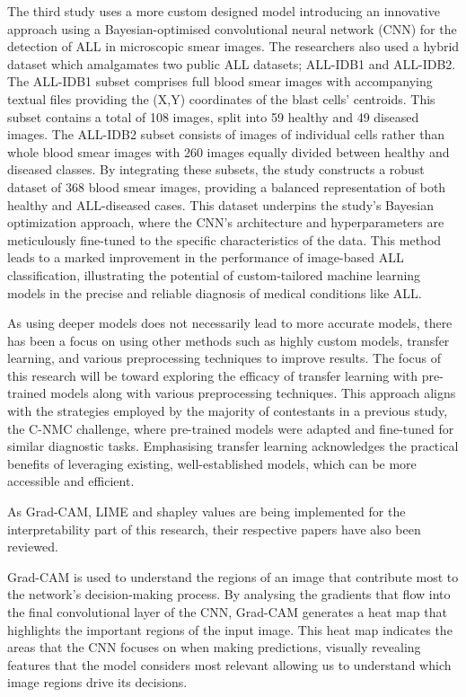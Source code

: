 \documentclass[
	a4paper,
	10pt,
	unnumberedsections,
	twoside,
]{research_article}
\begin{document}
The third study uses a more custom designed model introducing an innovative approach using a Bayesian-optimised convolutional neural network (CNN) for the detection of ALL in microscopic smear images. The researchers also used a hybrid dataset which amalgamates two public ALL datasets; ALL-IDB1 and ALL-IDB2. The ALL-IDB1 subset comprises full blood smear images with accompanying textual files providing the (X,Y) coordinates of the blast cells' centroids. This subset contains a total of 108 images, split into 59 healthy and 49 diseased images. The ALL-IDB2 subset consists of images of individual cells rather than whole blood smear images with 260 images equally divided between healthy and diseased classes. By integrating these subsets, the study constructs a robust dataset of 368 blood smear images, providing a balanced representation of both healthy and ALL-diseased cases. This dataset underpins the study's Bayesian optimization approach, where the CNN's architecture and hyperparameters are meticulously fine-tuned to the specific characteristics of the data. This method leads to a marked improvement in the performance of image-based ALL classification, illustrating the potential of custom-tailored machine learning models in the precise and reliable diagnosis of medical conditions like ALL.

As using deeper models does not necessarily lead to more accurate models, there has been a focus on using other methods such as highly custom models, transfer learning, and various preprocessing techniques to improve results. The focus of this research will be toward exploring the efficacy of transfer learning with pre-trained models along with various preprocessing techniques. This approach aligns with the strategies employed by the majority of contestants in a previous study, the C-NMC challenge, where pre-trained models were adapted and fine-tuned for similar diagnostic tasks. Emphasising transfer learning acknowledges the practical benefits of leveraging existing, well-established models, which can be more accessible and efficient.

\newpage
As Grad-CAM, LIME and shapley values are being implemented for the interpretability part of this research, their respective papers have also been reviewed.

Grad-CAM is used to understand the regions of an image that contribute most to the network's decision-making process. By analysing the gradients that flow into the final convolutional layer of the CNN, Grad-CAM generates a heat map that highlights the important regions of the input image. This heat map indicates the areas that the CNN focuses on when making predictions, visually revealing features that the model considers most relevant allowing us to understand which image regions drive its decisions.
\end{document}
